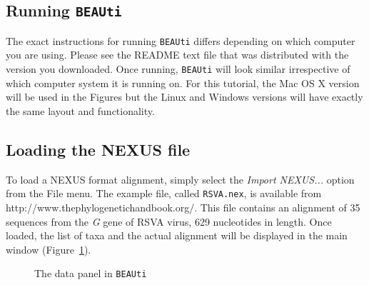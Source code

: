 \documentclass[cup7b, english]{cupbook}
\begin{document}
\subsection{Running \texttt{BEAUti}}

The exact instructions for running \texttt{BEAUti} differs depending on which computer you are using. Please see the README
text file that was distributed with the version you downloaded. Once running, \texttt{BEAUti} will look similar irrespective
of which computer system it is running on. For this tutorial, the Mac OS X version will be used in the Figures but
the Linux and Windows versions will have exactly the same layout and functionality.

\subsection{Loading the NEXUS file}

To load a NEXUS format alignment, simply select the {\it Import NEXUS...} option from the File menu. The example
file, called \texttt{RSVA.nex}, is available from http://www.thephylogenetichandbook.org/. This file contains an
alignment of 35 sequences from the {\it G} gene of RSVA virus, 629 nucleotides in length.
Once loaded, the list of taxa and the actual alignment will be displayed in the
main window (Figure~\ref{fig:figure1}).

\begin{figure}[htbp]
\begin{center}
\leavevmode
{}
\end{center}
\caption{The data panel in \texttt{BEAUti}}
\label{fig:figure1}
\end{figure}
\end{document}
